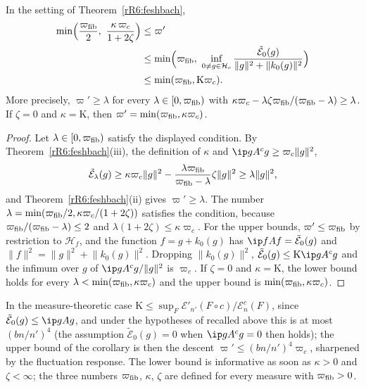 \begin{corollary}\label{rR6:recursion}
In the setting of Theorem~\textup{\ref{rR6:feshbach}},
\begin{align*}
\min\Bigl(\frac{\varpi_{\rm fib}}2,\ \frac{\kappa\,\varpi_c}{1+2\zeta}
\Bigr)&\le\varpi'\\
&\le\min\Bigl(\varpi_{\rm fib},\ \inf_{0\ne g\in\mathcal H_c}
\frac{\tilde{\mathcal E}_0(g)}{\lVert g\rVert^2+\lVert k_0(g)\rVert^2}
\Bigr)\\
&\le\min(\varpi_{\rm fib},\mathrm K\varpi_c).
\end{align*}
More precisely, $\varpi'\ge\lambda$ for every $\lambda\in[0,\varpi_{\rm
fib})$ with $\kappa\varpi_c-\lambda\zeta\varpi_{\rm fib}/(\varpi_{\rm fib}-
\lambda)\ge\lambda$. If $\zeta=0$ and $\kappa=\mathrm K$, then $\varpi'=
\min(\varpi_{\rm fib},\kappa\varpi_c)$.
\end{corollary}

\begin{proof}
Let $\lambda\in[0,\varpi_{\rm fib})$ satisfy the displayed condition. By
Theorem~\ref{rR6:feshbach}(iii), the definition of $\kappa$ and $\ip g
{A^cg}\ge\varpi_c\lVert g\rVert^2$,
\[
\tilde{\mathcal E}_\lambda(g)\ge\kappa\varpi_c\lVert g\rVert^2-\frac{\lambda
\varpi_{\rm fib}}{\varpi_{\rm fib}-\lambda}\zeta\lVert g\rVert^2\ge\lambda
\lVert g\rVert^2,
\]
and Theorem~\ref{rR6:feshbach}(ii) gives $\varpi'\ge\lambda$. The number
$\lambda=\min(\varpi_{\rm fib}/2,\kappa\varpi_c/(1+2\zeta))$ satisfies the
condition, because $\varpi_{\rm fib}/(\varpi_{\rm fib}-\lambda)\le2$ and
$\lambda(1+2\zeta)\le\kappa\varpi_c$. For the upper bounds, $\varpi'\le
\varpi_{\rm fib}$ by restriction to $\mathcal H_f$, and the function $f=g+
k_0(g)$ has $\ip fAf=\tilde{\mathcal E}_0(g)$ and $\lVert f\rVert^2=\lVert
g\rVert^2+\lVert k_0(g)\rVert^2$. Dropping $\lVert k_0(g)\rVert^2$,
$\tilde{\mathcal E}_0(g)\le\mathrm K\ip g{A^cg}$ and the infimum over $g$
of $\ip g{A^cg}/\lVert g\rVert^2$ is $\varpi_c$. If $\zeta=0$ and $\kappa=
\mathrm K$, the lower bound holds for every $\lambda<\min(\varpi_{\rm fib},
\kappa\varpi_c)$ and the upper bound is $\min(\varpi_{\rm fib},\kappa
\varpi_c)$.
\end{proof}

In the measure-theoretic case $\mathrm K\le\sup_F\mathcal E'_{n'}(F\circ c)/
\mathcal E^c_n(F)$, since $\tilde{\mathcal E}_0(g)\le\ip gAg$, and under
the hypotheses of \cite[Theorem~94(i)]{BBLR26} recalled above this is at
most $(bn/n')^4$ (the assumption $\tilde{\mathcal E}_0(g)=0$ when $\ip g
{A^cg}=0$ then holds); the upper bound of the corollary is then the descent
$\varpi'\le(bn/n')^4\varpi_c$, sharpened by the fluctuation response. The
lower bound is informative as soon as $\kappa>0$ and $\zeta<\infty$; the
three numbers $\varpi_{\rm fib}$, $\kappa$, $\zeta$ are defined for
every measure with $\varpi_{\rm fib}>0$.

